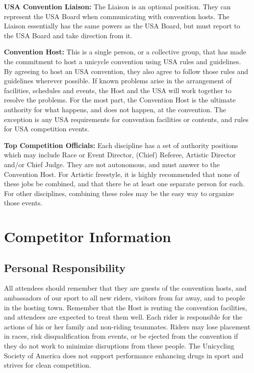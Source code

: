 \textbf{USA Convention Liaison:} The Liaison is an optional position. They can represent the USA Board when communicating with convention hosts.
The Liaison essentially has the same powers as the USA Board, but must report to the USA Board and take direction from it.

\textbf{Convention Host:} This is a single person, or a collective group, that has made the commitment to host a unicycle convention using USA rules and guidelines.
By agreeing to host an USA convention, they also agree to follow those rules and guidelines wherever possible.
If known problems arise in the arrangement of facilities, schedules and events, the Host and the USA will work together to resolve the problems.
For the most part, the Convention Host is the ultimate authority for what happens, and does not happen, at the convention.
The exception is any USA requirements for convention facilities or contents, and rules for USA competition events.

\textbf{Top Competition Officials:} Each discipline has a set of authority positions which may include Race or Event Director, (Chief) Referee, Artistic Director and/or Chief Judge.
They are not autonomous, and must answer to the Convention Host.
For Artistic freestyle, it is highly recommended that none of these jobs be combined, and that there be at least one separate person for each.
For other disciplines, combining these roles may be the easy way to organize those events.


\chapter{Competitor Information}

\section{Personal Responsibility}
All attendees should remember that they are guests of the convention hosts, and ambassadors of our sport to all new riders, visitors from far away, and to people in the hosting town.
Remember that the Host is renting the convention facilities, and attendees are expected to treat them well.
Each rider is responsible for the actions of his or her family and non-riding teammates.
Riders may lose placement in races, risk disqualification from events, or be ejected from the convention if they do not work to minimize disruptions from these people.
The Unicycling Society of America does not support
performance enhancing drugs in sport and strives for clean competition.

